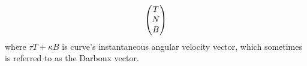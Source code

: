 \documentclass[10pt]{article}
\begin{document}
\begin{theorem}
\begin{equation*}
\begin{aligned}
                        \begin{array}{lc}
                            \setlength{\arraycolsep}{3pt}
                            \begingroup
                            \renewcommand*{\arraystretch}{1}
                            \begin{pmatrix}
                                T \\
                                N \\
                                B \\
                            \end{pmatrix}
                            \endgroup
                        \end{array}
                    \end{aligned}
                \end{equation*}
                where $\tau T+\kappa B$ is curve's instantaneous angular velocity vector, which sometimes is referred to as the Darboux vector.
            \end{theorem}
\end{document}
